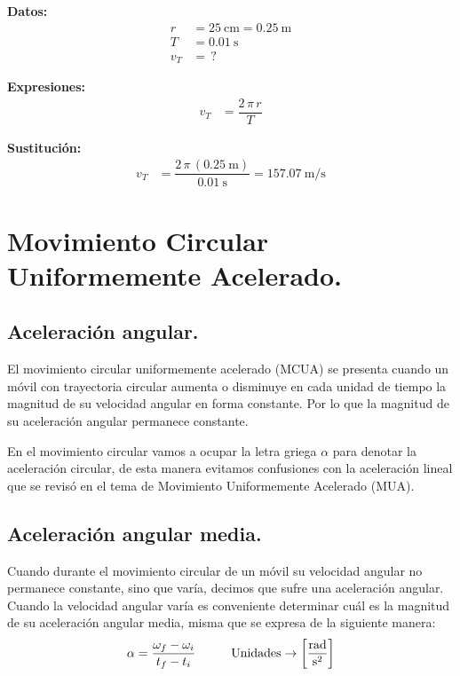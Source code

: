 \documentclass[12pt]{article}
\begin{document}
\begin{enumerate}
\vspace*{0.5cm}
\begin{minipage}[t]{0.4\linewidth}
\textbf{Datos:}
\begin{align*}
r &= \SI{25}{\centi\meter} = \SI{0.25}{\meter} \\
T &= \SI{0.01}{\second} \\
v_{T} &= \, ?
\end{align*}
\end{minipage}
\begin{minipage}[t]{0.4\linewidth}
\textbf{Expresiones:}
\begin{align*}
v_{T} &= \dfrac{2 \, \pi \, r }{T}
\end{align*}
\end{minipage}

\textbf{Sustitución:}
\begin{align*}
v_{T} &= \dfrac{2 \, \pi \, \left( \SI{0.25}{\meter} \right)}{\SI{0.01}{\second}}= \SI[per-mode=fraction]{157.07}{\meter\per\second}
\end{align*}
\end{enumerate}

\section{Movimiento Circular Uniformemente Acelerado.}
\subsection{Aceleración angular.}

El movimiento circular uniformemente acelerado (MCUA) se presenta cuando un móvil con trayectoria circular aumenta o disminuye en cada unidad de tiempo la magnitud de su velocidad angular en forma constante. Por lo que la magnitud de su aceleración angular permanece constante.

En el movimiento circular vamos a ocupar la letra griega $\alpha$ para denotar la aceleración circular, de esta manera evitamos confusiones con la aceleración lineal que se revisó en el tema de Movimiento Uniformemente Acelerado (MUA).

\subsection{Aceleración angular media.}

Cuando durante el movimiento circular de un móvil su velocidad angular no permanece constante, sino que varía, decimos que sufre una aceleración angular. Cuando la velocidad angular varía es conveniente determinar cuál es la magnitud de su aceleración angular media, misma que se expresa de la siguiente manera:
\begin{align*}
\alpha = \dfrac{\omega_{f} - \omega_{i}}{t_{f} - t_{i}} \hspace{1cm} \text{Unidades} \rightarrow \left[ \unit[per-mode=fraction]{\radian\per\square\second} \right]
\end{align*}
\end{document}
